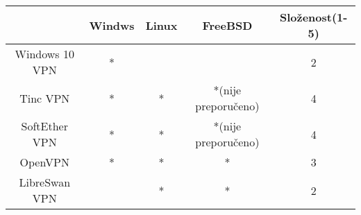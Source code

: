 \begin{center}
\begin{tabular}{c | c | c | c | c}
	 & \textbf{Windws} & \textbf{Linux} & \textbf{FreeBSD} &
         \textbf{Složenost(1-5)} \\
	 \hline

	Windows 10 VPN & * & & & 2 \\
	\hline
        Tinc VPN & * & * & *(nije preporučeno)  & 4\\
	\hline
	SoftEther VPN & * & * & *(nije preporučeno) & 4 \\
	\hline
	OpenVPN & * & * & * & 3 \\
	\hline
	LibreSwan VPN & & *  & * & 2 \\
\end{tabular}
\end{center}
